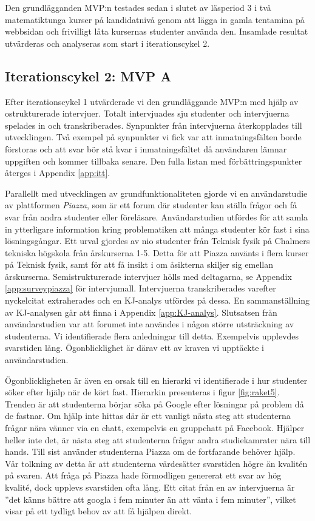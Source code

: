 Den grundlägganden MVP:n testades sedan i slutet av läsperiod 3 i två matematiktunga kurser på kandidatnivå genom att lägga in gamla tentamina på webbsidan och frivilligt låta kursernas studenter använda den. Insamlade resultat utvärderas och analyseras som start i iterationscykel 2.

\subsection{Iterationscykel 2: MVP A}
Efter iterationscykel 1 utvärderade vi den grundläggande MVP:n med hjälp av ostrukturerade intervjuer. Totalt intervjuades sju studenter och intervjuerna spelades in och transkriberades. Synpunkter från intervjuerna återkopplades till utvecklingen. Två exempel på synpunkter vi fick var att inmatningsfälten borde förstoras och att svar bör stå kvar i inmatningsfältet då användaren lämnar uppgiften och kommer tillbaka senare. Den fulla listan med förbättringspunkter återges i Appendix \ref{app:itt}. 

Parallellt med utvecklingen av grundfunktionaliteten gjorde vi en användarstudie av plattformen \emph{Piazza}, som är ett forum där studenter kan ställa frågor och få svar från andra studenter eller föreläsare. Användarstudien utfördes för att samla in ytterligare information kring problematiken att många studenter kör fast i sina lösningsgångar. Ett urval gjordes av nio studenter från Teknisk fysik på Chalmers tekniska högskola från årskurserna 1-5. Detta för att Piazza använts i flera kurser på Teknisk fysik, samt för att få insikt i om åsikterna skiljer sig emellan årskurserna. Semistrukturerade intervjuer hölls med deltagarna, se Appendix \ref{app:surveypiazza} för intervjumall. Intervjuerna transkriberades varefter nyckelcitat extraherades och en KJ-analys utfördes på dessa. En sammanställning av KJ-analysen går att finna i Appendix \ref{app:KJ-analys}. Slutsatsen från användarstudien var att forumet inte användes i någon större utsträckning av studenterna. Vi identifierade flera anledningar till detta. Exempelvis upplevdes svarstiden lång. Ögonblicklighet är därav ett av kraven vi upptäckte i användarstudien.

Ögonblickligheten är även en orsak till en hierarki vi identifierade i hur studenter söker efter hjälp när de kört fast. Hierarkin presenteras i figur \ref{fig:raket5}. Trenden är att studenterna börjar söka på Google efter lösningar på problem då de fastnar. Om hjälp inte hittas där är ett vanligt nästa steg att studenterna frågar nära vänner via en chatt, exempelvis en gruppchatt på Facebook. Hjälper heller inte det, är nästa steg att studenterna frågar andra studiekamrater nära till hands. Till sist använder studenterna Piazza om de fortfarande behöver hjälp. Vår tolkning av detta är att studenterna värdesätter svarstiden högre än kvalitén på svaren. Att fråga på Piazza hade förmodligen genererat ett svar av hög kvalité, dock upplevs svarstiden ofta lång. Ett citat från en av intervjuerna är ''det känns bättre att googla i fem minuter än att vänta i fem minuter'', vilket visar på ett tydligt behov av att få hjälpen direkt.

